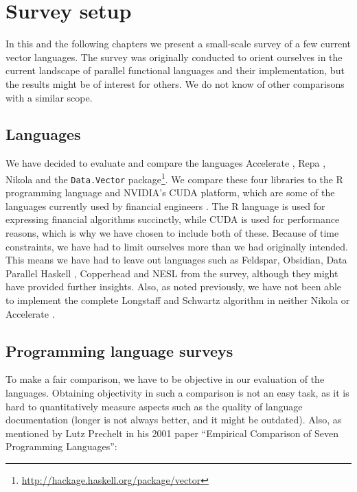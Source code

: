 \chapter{Survey setup}
In this and the following chapters we present a small-scale survey of
a few current vector languages. The survey was originally conducted to
orient ourselves in the current landscape of parallel functional
languages and their implementation, but the results might be of
interest for others. We do not know of other comparisons with a
similar scope.

\section{Languages}
We have decided to evaluate and compare the languages Accelerate
\cite{chakravarty2011accelerating}, Repa \cite{keller2010regular},
Nikola \cite{mainland2010nikola} and the \texttt{Data.Vector}
package\footnote{\url{http://hackage.haskell.org/package/vector}}. We
compare these four libraries to the R programming language and
NVIDIA's CUDA platform, which are some of the languages currently used
by financial engineers . The R language is used for expressing financial algorithms
succinctly, while CUDA is used for performance reasons, which is why
we have chosen to include both of these. Because of time constraints,
we have had to limit ourselves more than we had originally
intended. This means we have had to leave out languages such as
Feldspar\cite{axelsson2010feldspar},
Obsidian\cite{svensson2011obsidian}, Data Parallel Haskell \cite{},
Copperhead\cite{Catanzaro2011} and NESL\cite{nesl} from the survey,
although they might have provided further insights. Also, as noted
previously, we have not been able to implement the complete Longstaff
and Schwartz algorithm in neither Nikola or Accelerate .


\section{Programming language surveys}
To make a fair comparison, we have to be objective in our evaluation
of the languages. Obtaining objectivity in such a comparison is not
an easy task, as it is hard to quantitatively measure aspects such as
the quality of language documentation (longer is not always better,
and it might be outdated). Also, as mentioned by Lutz Prechelt in his
2001 paper ``Empirical Comparison of Seven Programming Languages'':


